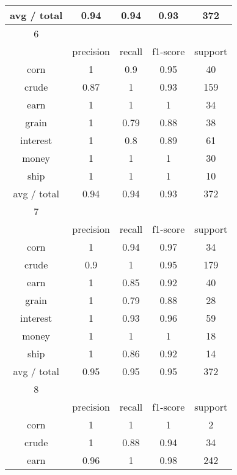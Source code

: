 \documentclass[11pt]{article}
\begin{document}
\begin{center}
\begin{longtable}{| c | c | c | c | c |}
 avg / total   & 0.94      & 0.94   & 0.93     & 372     \\
 \hline
6            &           &        &          &         \\
\hline
             & precision & recall & f1-score & support \\
 corn          & 1         & 0.9    & 0.95     & 40      \\
crude         & 0.87      & 1      & 0.93     & 159     \\
earn          & 1         & 1      & 1        & 34      \\
grain         & 1         & 0.79   & 0.88     & 38      \\
interest      & 1         & 0.8    & 0.89     & 61      \\
money         & 1         & 1      & 1        & 30      \\
ship          & 1         & 1      & 1        & 10      \\
 avg / total   & 0.94      & 0.94   & 0.93     & 372     \\
 \hline
7            &           &        &          &         \\
\hline
             & precision & recall & f1-score & support \\
 corn          & 1         & 0.94   & 0.97     & 34      \\
crude         & 0.9       & 1      & 0.95     & 179     \\
earn          & 1         & 0.85   & 0.92     & 40      \\
grain         & 1         & 0.79   & 0.88     & 28      \\
interest      & 1         & 0.93   & 0.96     & 59      \\
money         & 1         & 1      & 1        & 18      \\
ship          & 1         & 0.86   & 0.92     & 14      \\
 avg / total   & 0.95      & 0.95   & 0.95     & 372     \\
\hline
8            &           &        &          &         \\
\hline
             & precision & recall & f1-score & support \\
 corn          & 1         & 1      & 1        & 2       \\
crude         & 1         & 0.88   & 0.94     & 34      \\
earn          & 0.96      & 1      & 0.98     & 242     \\

\end{longtable}
\end{center}
\end{document}
